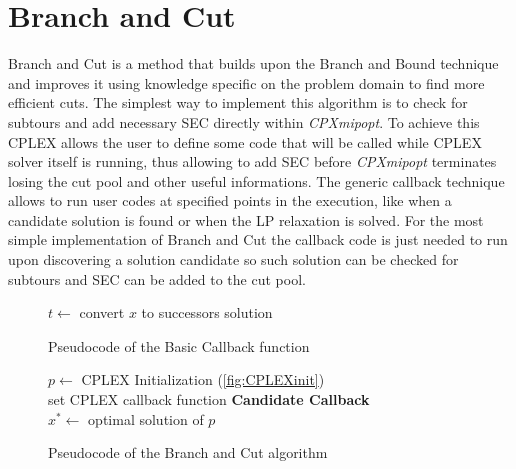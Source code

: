 
\section{Branch and Cut}
Branch and Cut is a method that builds upon the Branch and Bound technique and improves it using knowledge specific on the problem domain to find more efficient cuts.
The simplest way to implement this algorithm is to check for subtours and add necessary SEC directly within \textit{CPXmipopt}.
To achieve this CPLEX allows the user to define some code that will be called while CPLEX solver itself is running, thus allowing to add SEC before \textit{CPXmipopt} terminates losing the cut pool and other useful informations.
The generic callback technique allows to run user codes at specified points in the execution, like when a candidate solution is found or when the LP relaxation is solved.
For the most simple implementation of Branch and Cut the callback code is just needed to run upon discovering a solution candidate so such solution can be checked for subtours and SEC can be added to the cut pool.

\begin{figure}[htbp]
	\begin{algorithm}[H]
		\vspace{2mm}
		$t \gets$ convert $x$ to successors solution\\
	\end{algorithm}
	\caption{Pseudocode of the Basic Callback function} \label{fig:callbackBase}
\end{figure}
\begin{figure}[htbp]
	\begin{algorithm}[H]
		\vspace{2mm}
		$p \gets$ CPLEX Initialization (\ref{fig:CPLEXinit})\\
		set CPLEX callback function \textbf{Candidate Callback}\\
		$x^* \gets$ optimal solution of $p$\\
	\end{algorithm}
	\caption{Pseudocode of the Branch and Cut algorithm} \label{fig:branchAndCut}
\end{figure}

